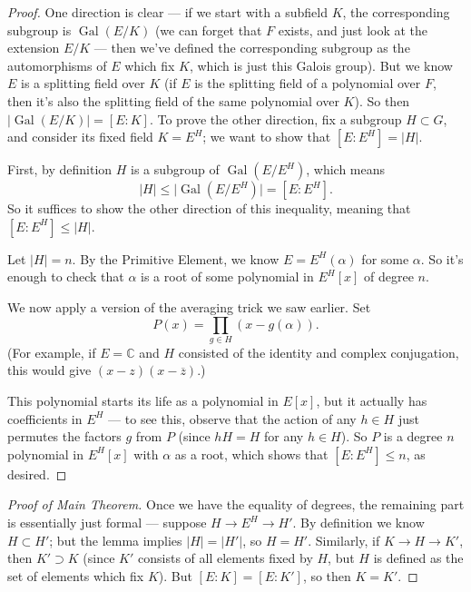 \begin{proof}
One direction is clear --- if we start with a subfield $K$, the corresponding subgroup is $\operatorname{Gal}(E/K)$ (we can forget that $F$ exists, and just look at the extension $E/K$ --- then we've defined the corresponding subgroup as the automorphisms of $E$ which fix $K$, which is just this Galois group). But we know $E$ is a splitting field over $K$ (if $E$ is the splitting field of a polynomial over $F$, then it's also the splitting field of the same polynomial over $K$). So then $\lvert \operatorname{Gal}(E/K)\rvert = [E : K]$. 
To prove the other direction, fix a subgroup $H \subset G$, and consider its fixed field $K = E^H$; we want to show that $[E : E^H] = \lvert H \rvert$. 

First, by definition $H$ is a subgroup of $\operatorname{Gal}(E/E^H)$, which means \[\lvert H \rvert \leq \lvert \operatorname{Gal}(E/E^H)\rvert = [E : E^H].\] So it suffices to show the other direction of this inequality, meaning that $[E : E^H] \leq \lvert H \rvert$. 

Let $\lvert H \rvert = n$. By the Primitive Element, we know $E = E^H(\alpha)$ for some $\alpha$. So it's enough to check that $\alpha$ is a root of some polynomial in $E^H[x]$ of degree $n$. 

We now apply a version of the averaging trick we saw earlier. Set \[P(x) = \prod_{g \in H} (x - g(\alpha)).\] (For example, if $E = \mathbb{C}$ and $H$ consisted of the identity and complex conjugation, this would give $(x - z)(x - \overline{z})$.) 

This polynomial starts its life as a polynomial in $E[x]$, but it actually has coefficients in $E^H$ --- to see this, observe that the action of any $h \in H$ just permutes the factors $g$ from $P$ (since $hH = H$ for any $h \in H$). So $P$ is a degree $n$ polynomial in $E^H[x]$ with $\alpha$ as a root, which shows that $[E : E^H] \leq n$, as desired. 
\end{proof}

\begin{proof}[Proof of Main Theorem]
Once we have the equality of degrees, the remaining part is essentially just formal --- suppose $H \to E^H \to H'$. By definition we know $H \subset H'$; but the lemma implies $\lvert H \rvert = \lvert H' \rvert$, so $H = H'$. Similarly, if $K \to H \to K'$, then $K' \supset K$ (since $K'$ consists of all elements fixed by $H$, but $H$ is defined as the set of elements which fix $K$). But $[E : K] = [E : K']$, so then $K = K'$. 
\end{proof}

